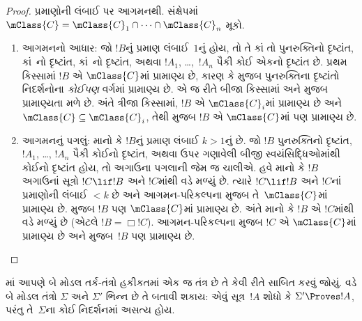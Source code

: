 \begin{proof}
  પ્રમાણોની લંબાઈ પર આગમનથી. સંક્ષેપમાં $\mClass{C} =
  \mClass{C}_1 \cap \dots \cap \mClass{C}_n$ મૂકો.
  \begin{enumerate}
  \item આગમનનો આધાર: જો $!B$નું પ્રમાણ લંબાઈ~$1$નું હોય, તો તે
    કાં તો પુનરુક્તિનો દૃષ્ટાંત, કાં~નો દૃષ્ટાંત,
    કાં~\Dual{}નો દૃષ્ટાંત, અથવા $!A_1$, \dots,~$!A_n$ પૈકી કોઈ
    એકનો દૃષ્ટાંત છે. પ્રથમ કિસ્સામાં $!B$ એ $\mClass{C}$માં
    પ્રામાણ્ય છે, કારણ કે  મુજબ
    પુનરુક્તિના દૃષ્ટાંતો નિદર્શનોના \emph{કોઈપણ} વર્ગમાં પ્રામાણ્ય છે.
    એ જ રીતે બીજા કિસ્સામાં
     અને
       મુજબ પ્રામાણ્યતા મળે છે.
    અંતે ત્રીજા કિસ્સામાં, $!B$ એ $\mClass{C}_i$માં પ્રામાણ્ય છે અને
    $\mClass{C} \subseteq \mClass{C}_i$, તેથી
     મુજબ $!B$ એ $\mClass{C}$માં
    પણ પ્રામાણ્ય છે.
  \item આગમનનું પગલું: માનો કે $!B$નું પ્રમાણ લંબાઈ $k>1$નું છે. જો
    $!B$ પુનરુક્તિનો દૃષ્ટાંત, $!A_1$, \dots, $!A_n$ પૈકી કોઈનો
    દૃષ્ટાંત, અથવા ઉપર ગણાવેલી બીજી સ્વયંસિદ્ધિઓમાંથી કોઈનો દૃષ્ટાંત
    હોય, તો અગાઉના પગલાની જેમ જ ચાલીએ.
    હવે માનો કે $!B$ અગાઉનાં સૂત્રો $!C \lif !B$ અને $!C$માંથી
    \MP{} વડે મળ્યું છે. ત્યારે $!C \lif !B$ અને $!C$નાં પ્રમાણોની
    લંબાઈ $<k$ છે અને આગમન-પરિકલ્પના મુજબ તે~$\mClass{C}$માં પ્રામાણ્ય
    છે.  મુજબ $!B$ પણ
    $\mClass{C}$માં પ્રામાણ્ય છે. અંતે માનો કે $!B$ એ $!C$માંથી
    \Nec{} વડે મળ્યું છે (એટલે $!B = \Box!C$). આગમન-પરિકલ્પના મુજબ
    $!C$ એ $\mClass{C}$માં પ્રામાણ્ય છે અને
     મુજબ~$!B$ પણ પ્રામાણ્ય છે.
  \end{enumerate}
\end{proof}
\endgroup

\begingroup
\makeatletter{}\makeatother


\label{guunit:OLP-0437}


માં આપણે બે મોડલ તર્ક-તંત્રો હકીકતમાં એક જ તંત્ર છે તે
કેવી રીતે સાબિત કરવું જોયું.  વડે બે મોડલ
તંત્રો $\Sigma$ અને $\Sigma'$ ભિન્ન છે તે બતાવી શકાય: એવું
સૂત્ર~$!A$ શોધો કે $\Sigma' \Proves !A$, પરંતુ તે~$\Sigma$ના
કોઈ નિદર્શનમાં અસત્ય હોય.

